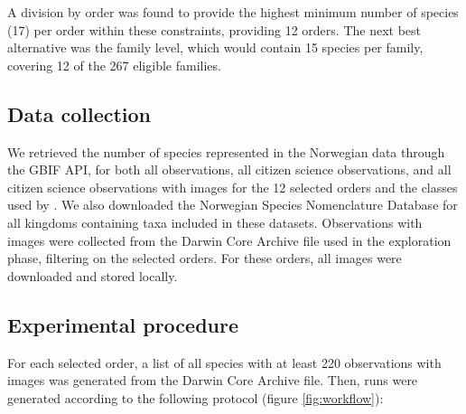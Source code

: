 \documentclass{article}
\begin{document}
A division by order was found to provide the highest minimum number of species (17) per order within these constraints, providing 12 orders. The next best alternative was the family level, which would contain 15 species per family, covering 12 of the 267 eligible families.

\subsection*{Data collection}
We retrieved the number of species represented in the Norwegian data through the GBIF API, for both all observations, all citizen science observations, and all citizen science observations with images for the 12 selected orders and the classes used by \citeauthor{Troudet2017}\autocite{Troudet2017}. We also downloaded the Norwegian Species Nomenclature Database for all kingdoms containing taxa included in these datasets. Observations with images were collected from the Darwin Core Archive file used in the exploration phase, filtering on the selected orders. For these orders, all images were downloaded and stored locally.

\subsection*{Experimental procedure}
For each selected order, a list of all species with at least 220 observations with images was generated from the Darwin Core Archive file\autocite{GBIF_dataset}. Then, runs were generated according to the following protocol (figure \ref{fig:workflow}): 
\end{document}
